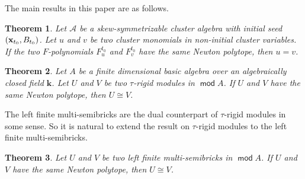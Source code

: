 \documentclass[10pt]{amsart}
\newtheorem{theorem}{Theorem}[section]
\theoremstyle{definition}
\theoremstyle{remark}
\numberwithin{equation}{section}
\def\mod{\opname{mod}\nolimits}
\newcommand{\opname}[1]{\operatorname{\mathsf{#1}}}
\begin{document}
The main results in this paper are as follows.






\begin{theorem}\label{A-thm}
Let $\mathcal A$ be a skew-symmetrizable cluster algebra with initial seed $({\bf x}_{t_0}, B_{t_0})$. Let $u$ and $v$ be two cluster monomials in non-initial cluster variables.
 If the two $F$-polynomials $F_u^{t_0}$ and $F_{v}^{t_0}$ have the same Newton polytope, then $u=v$.   
\end{theorem}

\begin{theorem}\label{B-thm}
Let $A$ be a finite dimensional basic algebra over an algebraically closed field $\mathbf{k}$. Let $U$ and $V$ be two $\tau$-rigid modules in $\mod A$. If $U$ and $V$ have the same Newton polytope, then $U\cong V$.  
\end{theorem}

The left finite multi-semibricks are the dual counterpart of $\tau$-rigid modules in some sense. So it is natural to extend the result on $\tau$-rigid modules to the left finite multi-semibricks.

\begin{theorem}\label{C-thm}
 Let $U$ and $V$ be two left finite multi-semibricks in $\mod A$. If $U$ and $V$ have the same Newton polytope, then $U\cong V$.
\end{theorem}
\end{document}
